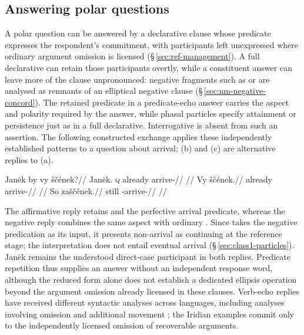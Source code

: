 \subsection{Answering polar questions}
\label{sec:polar-answers}

A polar question can be answered by a declarative clause whose predicate
expresses the respondent's commitment, with participants left unexpressed
where ordinary argument omission is licensed
(§\,\ref{sec:ref-management}). A full declarative can retain those
participants overtly, while a constituent answer can leave more of the
clause unpronounced: negative fragments such as  or 
are analysed as remnants of an elliptical negative clause
(§\,\ref{sec:nm-negative-concord}). The retained predicate in a
predicate-echo answer carries the aspect
and polarity required by the answer, while phasal particles specify
attainment or persistence just as in a full declarative. Interrogative
 is absent from such an assertion. The following constructed
exchange applies these independently established patterns to a question
about arrival; (b) and (c) are alternative replies to (a).

\pex\label{ex:polar-echo-answers}
\a
\begingl
\gla Janėk by vy ščének?//
\glb Janėk.\Dir{} \textsc{q} already arrive-\Pf{}//
\glft {}//
\endgl
\a
\begingl
\gla Vy ščének.//
\glb already arrive-\Pf{}//
\glft {}//
\endgl
\a
\begingl
\gla So zaščének.//
\glb still \Neg{}-arrive-\Pf{}//
\glft {}//
\endgl
\xe

The affirmative reply retains  and the perfective arrival predicate,
whereas the negative reply combines the same aspect with ordinary
. Since  takes the negative predication as its input,
it presents non-arrival as continuing at the reference stage; the
 interpretation does not entail eventual arrival
(§\,\ref{sec:class1-particles}). Janėk remains the understood direct-case
participant in both replies. Predicate repetition thus supplies an answer
without an independent response word, although the reduced form alone does
not establish a dedicated ellipsis operation beyond the argument omission
already licensed in these clauses. Verb-echo replies have received different
syntactic analyses across languages, including analyses involving omission
and additional movement \cite[ch.~3]{holmberg2016}; the Iridian examples
commit only to the independently licensed omission of recoverable arguments.

